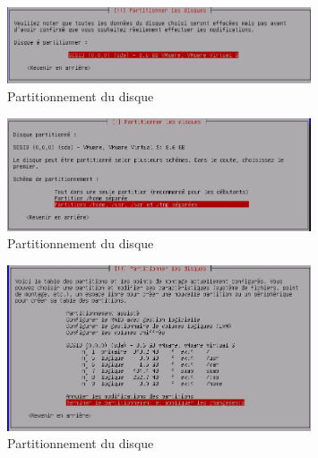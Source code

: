 \documentclass[11pt,a4paper,titlepage, oneside]{article}
\begin{document}
	 \newpage
                \begin{figure}[h]
                        \centering
                        \includegraphics[width=0.8\textwidth,natwidth=610,natheight=642]{images/debian13.png}
                        \caption{Partitionnement du disque}
                \end{figure}


		 \newpage
                \begin{figure}[h]
                        \centering
                        \includegraphics[width=0.8\textwidth,natwidth=610,natheight=642]{images/debian14.png}
                        \caption{Partitionnement du disque}
                \end{figure}

	\newpage
                \begin{figure}[h]
                        \centering
                        \includegraphics[width=0.8\textwidth,natwidth=610,natheight=642]{images/debian15.png}
                        \caption{Partitionnement du disque}
                \end{figure}
\end{document}
